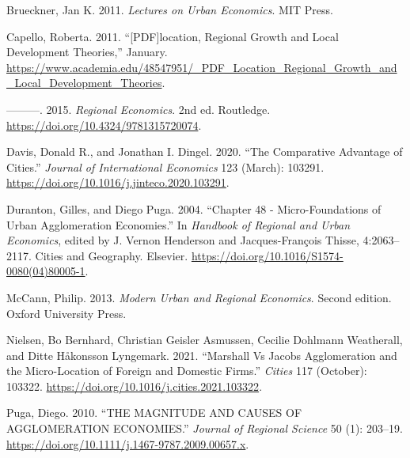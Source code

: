 \documentclass[
  10,
  a4paper,
]{article}
\newlength{\cslhangindent}
\newlength{\cslentryspacingunit} %
\newenvironment{CSLReferences}[2] %
 {%
  \setlength{\parindent}{0pt}
  \ifodd #1
  \let\oldpar\par
  \def\par{\hangindent=\cslhangindent\oldpar}
  \fi
  \setlength{\parskip}{#2\cslentryspacingunit}
 }%
 {}
\begin{document}
\hypertarget{refs}{}
\begin{CSLReferences}{1}{0}
\leavevmode{}%
Brueckner, Jan K. 2011. \emph{Lectures on Urban Economics}. MIT Press.

\leavevmode{}%
Capello, Roberta. 2011. {``{[}PDF{]}location, Regional Growth and Local
Development Theories,''} January.
\url{https://www.academia.edu/48547951/_PDF_Location_Regional_Growth_and_Local_Development_Theories}.

\leavevmode{}%
---------. 2015. \emph{Regional Economics}. 2nd ed. Routledge.
\url{https://doi.org/10.4324/9781315720074}.

\leavevmode{}%
Davis, Donald R., and Jonathan I. Dingel. 2020. {``The Comparative
Advantage of Cities.''} \emph{Journal of International Economics} 123
(March): 103291. \url{https://doi.org/10.1016/j.jinteco.2020.103291}.

\leavevmode{}%
Duranton, Gilles, and Diego Puga. 2004. {``Chapter 48 -
Micro-Foundations of Urban Agglomeration Economies.''} In \emph{Handbook
of Regional and Urban Economics}, edited by J. Vernon Henderson and
Jacques-François Thisse, 4:2063--2117. Cities and Geography. Elsevier.
\url{https://doi.org/10.1016/S1574-0080(04)80005-1}.

\leavevmode{}%
McCann, Philip. 2013. \emph{Modern Urban and Regional Economics}. Second
edition. Oxford University Press.

\leavevmode{}%
Nielsen, Bo Bernhard, Christian Geisler Asmussen, Cecilie Dohlmann
Weatherall, and Ditte Håkonsson Lyngemark. 2021. {``Marshall Vs Jacobs
Agglomeration and the Micro-Location of Foreign and Domestic Firms.''}
\emph{Cities} 117 (October): 103322.
\url{https://doi.org/10.1016/j.cities.2021.103322}.

\leavevmode{}%
Puga, Diego. 2010. {``THE MAGNITUDE AND CAUSES OF AGGLOMERATION
ECONOMIES.''} \emph{Journal of Regional Science} 50 (1): 203--19.
\url{https://doi.org/10.1111/j.1467-9787.2009.00657.x}.

\end{CSLReferences}
\end{document}
